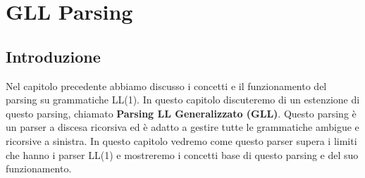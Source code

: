 \chapter{GLL Parsing}
\section{Introduzione}
Nel capitolo precedente abbiamo discusso i concetti e il funzionamento del parsing su grammatiche LL(1). In questo capitolo discuteremo di un estenzione di questo parsing, chiamato \textbf{Parsing LL Generalizzato (GLL)}. Questo parsing è un parser a discesa ricorsiva ed è adatto a gestire tutte  le grammatiche ambigue e ricorsive a sinistra. In questo capitolo vedremo come questo parser supera i limiti che hanno i parser LL(1) e mostreremo i concetti base di questo parsing e del suo funzionamento.
